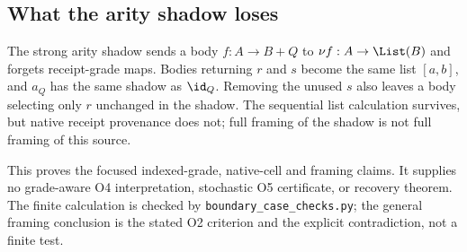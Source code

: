 \subsection{What the arity shadow loses}
The strong arity shadow sends a body $f:A\to B+Q$ to
$\nu f:A\to\List(B)$ and forgets receipt-grade maps. Bodies returning
$r$ and $s$ become the same list $[a,b]$, and $a_Q$ has the same shadow
as $\id_Q$. Removing the unused $s$ also leaves a body selecting only
$r$ unchanged in the shadow. The sequential list calculation survives,
but native receipt provenance does not; full framing of the shadow is
not full framing of this source.

This proves the focused indexed-grade, native-cell and framing claims.
It supplies no grade-aware O4 interpretation, stochastic O5 certificate,
or recovery theorem. The finite calculation is checked by
\texttt{boundary\_case\_checks.py}; the general framing conclusion is
the stated O2 criterion and the explicit contradiction, not a finite test.

